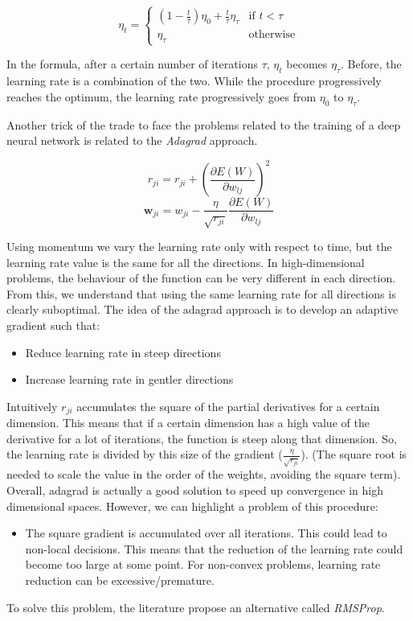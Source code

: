 \[
	\eta_{t}=
	\begin{cases}
		(1-\frac{t}{\tau})\eta_{0}+ \frac{t}{\tau}\eta_{\tau} & \text{if $t<\tau$} \\
		\eta_{\tau}                                           & \text{otherwise}
	\end{cases}
\]

In the formula, after a certain number of iterations $\tau$, $\eta_{t}$ becomes $\eta
_{\tau}$. Before, the learning rate is a combination of the two. While the
procedure progressively reaches the optimum, the learning rate progressively goes
from $\eta_{0}$ to $\eta_{\tau}$.
\newline

Another trick of the trade to face the problems related to the training of a deep
neural network is related to the \textit{Adagrad} approach.

\[
	r_{ji}= r_{ji}+ (\frac{\partial E(W)}{\partial w_{lj}})^{2}
\]
\[
	\pmb{w}_{ji}= w_{ji}- \frac{\eta}{\sqrt{r_{ji}}}\frac{\partial E(W)}{\partial
	w_{lj}}
\]

Using momentum we vary the learning rate only with respect to time, but the
learning rate value is the same for all the directions. In high-dimensional problems,
the behaviour of the function can be very different in each direction. From this,
we understand that using the same learning rate for all directions is clearly
suboptimal. The idea of the adagrad approach is to develop an adaptive gradient such
that:
\begin{itemize}
	\item Reduce learning rate in steep directions

	\item Increase learning rate in gentler directions
\end{itemize}

Intuitively $r_{ji}$ accumulates the square of the partial derivatives for a certain
dimension. This means that if a certain dimension has a high value of the
derivative for a lot of iterations, the function is steep along that dimension.
So, the learning rate is divided by this size of the gradient ($\frac{\eta}{\sqrt{r_{ji}}}$).
(The square root is needed to scale the value in the order of the weights,
avoiding the square term).\\ Overall, adagrad is actually a good solution to
speed up convergence in high dimensional spaces. However, we can highlight a
problem of this procedure:
\begin{itemize}
	\item The square gradient is accumulated over all iterations. This could lead
		to non-local decisions. This means that the reduction of the learning rate could
		become too large at some point. For non-convex problems, learning rate reduction
		can be excessive/premature.
\end{itemize}
To solve this problem, the literature propose an alternative called \textit{RMSProp}.


